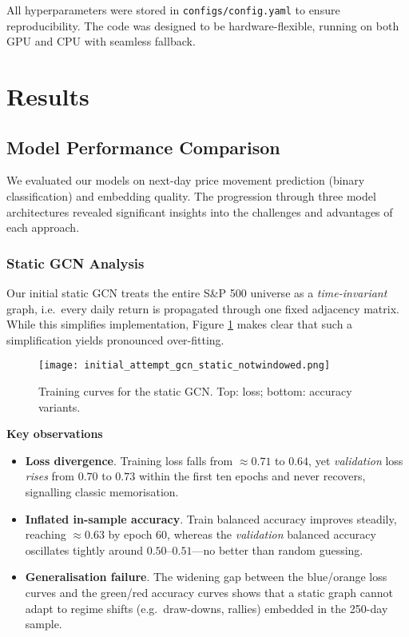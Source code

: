 \documentclass[12pt]{article}
\begin{document}
All hyperparameters were stored in \texttt{configs/config.yaml} to ensure reproducibility. The code was designed to be hardware-flexible, running on both GPU and CPU with seamless fallback.

\section{Results}

\subsection{Model Performance Comparison}

We evaluated our models on next-day price movement prediction (binary classification) and embedding quality. The progression through three model architectures revealed significant insights into the challenges and advantages of each approach.

\subsubsection{Static GCN Analysis}

Our initial static GCN treats the entire S\&P 500 universe as a \emph{time-invariant} graph, i.e.\ every daily return is propagated through one fixed adjacency matrix.  
While this simplifies implementation, Figure \ref{fig:static_gcn_metrics} makes clear that such a simplification yields pronounced over-fitting.

\begin{figure}[h]
    \centering
    \texttt{[image: initial\_attempt\_gcn\_static\_notwindowed.png]}
    \caption{Training curves for the static GCN.  Top: loss; bottom: accuracy variants.}
    \label{fig:static_gcn_metrics}
\end{figure}

\noindent\textbf{Key observations}
\begin{itemize}
    \item \textbf{Loss divergence}.  
          Training loss falls from $\approx0.71$ to $0.64$, yet \emph{validation} loss \emph{rises} from $0.70$ to $0.73$ within the first ten epochs and never recovers, signalling classic memorisation.
    \item \textbf{Inflated in-sample accuracy}.  
          Train balanced accuracy improves steadily, reaching $\approx0.63$ by epoch 60, whereas the \emph{validation} balanced accuracy oscillates tightly around $0.50$–$0.51$—no better than random guessing.
    \item \textbf{Generalisation failure}.  
          The widening gap between the blue/orange loss curves and the green/red accuracy curves shows that a static graph cannot adapt to regime shifts (e.g.\ draw-downs, rallies) embedded in the 250-day sample.
\end{itemize}
\end{document}
